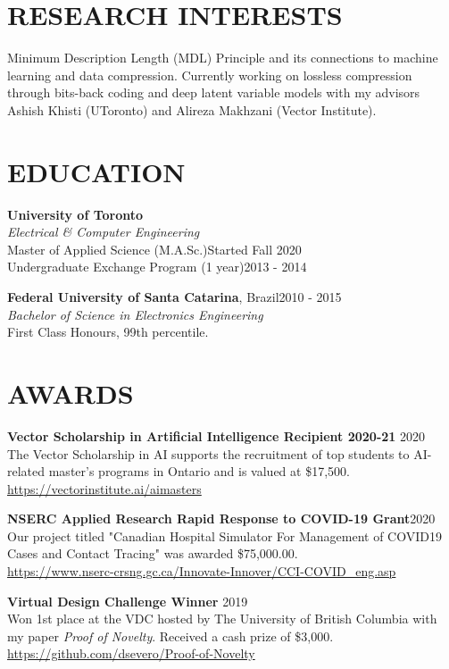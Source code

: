 \documentclass[margin, line]{res}
\begin{document}
\address{\textbf{For more information}: \url{https://dsevero.com}}
\begin{resume}

\section{RESEARCH INTERESTS}
Minimum Description Length (MDL) Principle and its connections to machine learning and data compression. Currently working on lossless compression through bits-back coding and deep latent variable models with my advisors Ashish Khisti (UToronto) and Alireza Makhzani (Vector Institute).

\section{EDUCATION}
\textbf{University of Toronto}\\
{\sl Electrical \& Computer Engineering}\\
Master of Applied Science (M.A.Sc.)\hfill Started Fall 2020\\
Undergraduate Exchange Program (1 year)\hfill 2013 - 2014

\textbf{Federal University of Santa Catarina}, Brazil\hfill 2010 - 2015 \\
{\sl Bachelor of Science in Electronics Engineering}\\
First Class Honours, 99th percentile.

\section{AWARDS}
\textbf{Vector Scholarship in Artificial Intelligence Recipient 2020-21} \hfill 2020\\
The Vector Scholarship in AI supports the recruitment of top students to AI-related master’s programs in Ontario and is valued at \$17,500.\\
\url{https://vectorinstitute.ai/aimasters}

\textbf{NSERC Applied Research Rapid Response to COVID-19 Grant}\hfill 2020\\
Our project titled "Canadian Hospital Simulator For Management of COVID19 Cases and Contact Tracing" was awarded \$75,000.00.\\
\url{https://www.nserc-crsng.gc.ca/Innovate-Innover/CCI-COVID_eng.asp}

\textbf{Virtual Design Challenge Winner} \hfill 2019\\
Won 1st place at the VDC hosted by The University of British Columbia with my paper \emph{Proof of Novelty}. Received a cash prize of \$3,000.\\
\url{https://github.com/dsevero/Proof-of-Novelty}


\end{resume}
\end{document}
